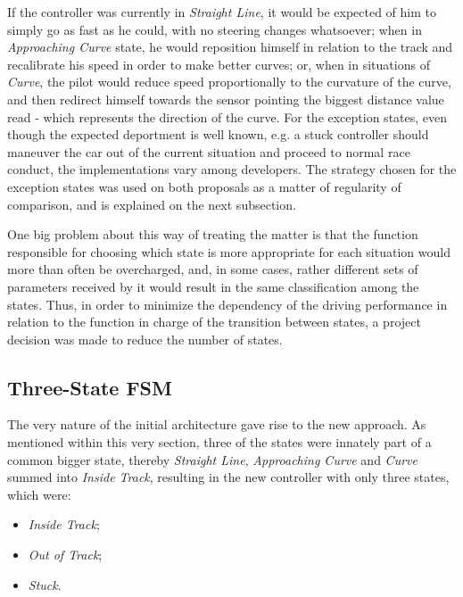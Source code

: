 	If the controller was currently in \emph{Straight Line}, it would be expected of him to simply go as fast as he
	could, with no steering changes whatsoever; when in \emph{Approaching Curve} state, he would reposition himself
	in relation to the track and recalibrate his speed in order to make better curves; or, when in situations of
	\emph{Curve}, the pilot would reduce speed proportionally to the curvature of the curve, and then redirect
	himself towards the sensor pointing the biggest distance value read - which represents the direction of the curve.
	For the exception states, even though the expected deportment is well known, e.g. a stuck controller should
	maneuver the car out of the current situation and proceed to normal race conduct, the implementations vary among
	developers. The strategy chosen for the exception states was used on both proposals as a matter of regularity of
	comparison, and is explained on the next subsection.
	
	One big problem about this way of treating the matter is that the function responsible for choosing which state
	is more appropriate for each situation would more than often be overcharged, and, in some cases, rather different
	sets of parameters received by it would result in the same classification among the states. Thus, in order to
	minimize the dependency of the driving performance in relation to the function in charge of the transition
	between states, a project decision was made to reduce the number of states.
		
\subsection{Three-State FSM} \label{subsec:FSM3}
	
	The very nature of the initial architecture gave rise to the new approach. As mentioned within this very section,
	three of the states were innately part of a common bigger state, thereby \emph{Straight Line},
	\emph{Approaching Curve} and \emph{Curve} summed into \emph{Inside Track}, resulting in the new controller with
	only three states, which were:
	
	\begin{itemize}
		
		\item \emph{Inside Track};
		
		\item \emph{Out of Track};
		
		\item \emph{Stuck}.
		
	\end{itemize}
	
